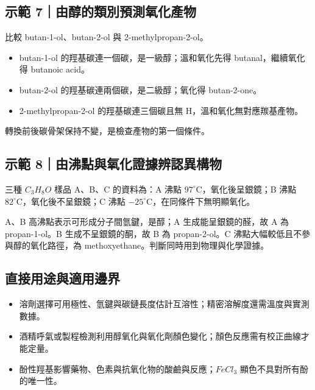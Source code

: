 \documentclass[11pt,a4paper]{article}
\providecommand{\tightlist}{%
  \setlength{\itemsep}{0pt}\setlength{\parskip}{0pt}}
\begin{document}
\begin{HandoutWorkedExample}

\subsection{示範 7｜由醇的類別預測氧化產物}\label{ux793aux7bc4-7ux7531ux9187ux7684ux985eux5225ux9810ux6e2cux6c27ux5316ux7522ux7269}

比較 butan-1-ol、butan-2-ol 與 2-methylpropan-2-ol。

\begin{itemize}
\tightlist
\item
  butan-1-ol 的羥基碳連一個碳，是一級醇；溫和氧化先得 butanal，繼續氧化得 butanoic acid。
\item
  butan-2-ol 的羥基碳連兩個碳，是二級醇；氧化得 butan-2-one。
\item
  2-methylpropan-2-ol 的羥基碳連三個碳且無 H，溫和氧化無對應羰基產物。
\end{itemize}

轉換前後碳骨架保持不變，是檢查產物的第一個條件。

\end{HandoutWorkedExample}

\begin{HandoutWorkedExample}

\subsection{示範 8｜由沸點與氧化證據辨認異構物}\label{ux793aux7bc4-8ux7531ux6cb8ux9edeux8207ux6c27ux5316ux8b49ux64daux8fa8ux8a8dux7570ux69cbux7269}

三種 \(C_3H_8O\) 樣品 A、B、C 的資料為：A 沸點 \(97^\circ\mathrm C\)，氧化後呈銀鏡；B 沸點 \(82^\circ\mathrm C\)，氧化後不呈銀鏡；C 沸點 \(-25^\circ\mathrm C\)，在同條件下無明顯氧化。

A、B 高沸點表示可形成分子間氫鍵，是醇；A 生成能呈銀鏡的醛，故 A 為 propan-1-ol。B 生成不呈銀鏡的酮，故 B 為 propan-2-ol。C 沸點大幅較低且不參與醇的氧化路徑，為 methoxyethane。判斷同時用到物理與化學證據。

\end{HandoutWorkedExample}

\subsection{直接用途與適用邊界}\label{ux76f4ux63a5ux7528ux9014ux8207ux9069ux7528ux908aux754c-3}

\begin{itemize}
\tightlist
\item
  溶劑選擇可用極性、氫鍵與碳鏈長度估計互溶性；精密溶解度還需溫度與實測數據。
\item
  酒精呼氣或製程檢測利用醇氧化與氧化劑顏色變化；顏色反應需有校正曲線才能定量。
\item
  酚性羥基影響藥物、色素與抗氧化物的酸鹼與反應；\(FeCl_3\) 顯色不具對所有酚的唯一性。
\end{itemize}
\end{document}
